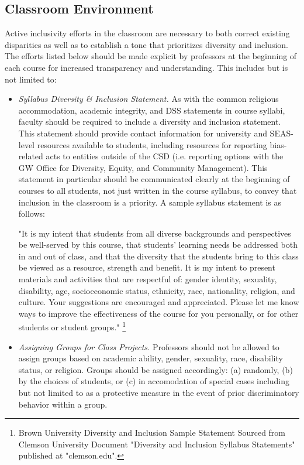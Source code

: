 \documentclass{article}
\begin{document}
\subsection{Classroom Environment} 
Active inclusivity efforts in the classroom are necessary to both correct existing disparities as well as to 
establish a tone that prioritizes diversity and inclusion. The efforts listed below should be made explicit by 
professors at the beginning of each course for increased transparency and understanding. 
This includes but is not limited to: 
\begin{itemize}
\item
\emph{Syllabus Diversity \& Inclusion Statement.} 
As with the common religious accommodation, academic integrity, and DSS statements in course syllabi, 
faculty should be required to include a diversity and inclusion statement. 
This statement should provide contact information for 
university and SEAS-level resources available to students, including resources
for reporting bias-related acts to entities outside of the CSD (i.e. reporting options 
with the GW Office for Diversity, Equity, and Community Management). 
This statement in particular should be communicated clearly at the beginning of courses to all students, 
not just written in the course syllabus, to convey that inclusion in the classroom is a priority. 
A sample syllabus statement is as follows: 
\begin{center}
"It is my intent that students from all diverse backgrounds and perspectives be well-served by this course, 
that students' learning needs be addressed both in and out of class, and that the diversity that the students 
bring to this class be viewed as a resource, strength and benefit. It is my intent to present materials and 
activities that are respectful of: gender identity, sexuality, disability, age, socioeconomic status, ethnicity, 
race, nationality, religion, and culture. Your suggestions are encouraged and appreciated. Please let me know ways to 
improve the effectiveness of the course for you personally, or for other students or student groups."
\footnote[1]{
Brown University Diversity and Inclusion Sample Statement Sourced from Clemson University Document "Diversity and Inclusion Syllabus Statements"
published at "clemson.edu".
}

\end{center}
\item
\emph{Assigning Groups for Class Projects.} 
Professors should not be allowed to assign groups based on academic ability, gender, sexuality, race, disability
status, or religion.
Groups should be assigned accordingly: (a) randomly, (b) by the choices of students, or (c) in accomodation of special 
cases including but not limited to as a protective measure in the event of prior discriminatory behavior within a group.


\end{itemize}
\end{document}
